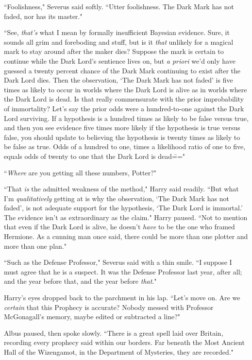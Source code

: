 ``Foolishness," Severus said softly. ``Utter foolishness. The Dark Mark has not faded, nor has its master."

``See, \emph{that's} what I mean by formally insufficient Bayesian evidence. Sure, it sounds all grim and foreboding and stuff, but is it \emph{that} unlikely for a magical mark to stay around after the maker dies? Suppose the mark is certain to continue while the Dark Lord's sentience lives on, but \emph{a priori} we'd only have guessed a twenty percent chance of the Dark Mark continuing to exist after the Dark Lord dies. Then the observation, `The Dark Mark has not faded' is five times as likely to occur in worlds where the Dark Lord is alive as in worlds where the Dark Lord is dead. Is that really commensurate with the prior improbability of immortality? Let's say the prior odds were a hundred-to-one against the Dark Lord surviving. If a hypothesis is a hundred times as likely to be false versus true, and then you see evidence five times more likely if the hypothesis is true versus false, you should update to believing the hypothesis is twenty times as likely to be false as true. Odds of a hundred to one, times a likelihood ratio of one to five, equals odds of twenty to one that the Dark Lord is dead\==="

``\emph{Where} are you getting all these numbers, Potter?"

``That \emph{is} the admitted weakness of the method," Harry said readily. ``But what I'm \emph{qualitatively} getting at is why the observation, `The Dark Mark has not faded', is not adequate support for the hypothesis, `The Dark Lord is immortal.' The evidence isn't as extraordinary as the claim." Harry paused. ``Not to mention that even if the Dark Lord is alive, he doesn't \emph{have} to be the one who framed Hermione. As a cunning man once said, there could be more than one plotter and more than one plan."

``Such as the Defense Professor," Severus said with a thin smile. ``I suppose I must agree that he is a suspect. It was the Defense Professor last year, after all; and the year before that, and the year before \emph{that}."

Harry's eyes dropped back to the parchment in his lap. ``Let's move on. Are we \emph{certain} that this Prophecy is accurate? Nobody messed with Professor McGonagall's memory, maybe edited or subtracted a line?"

Albus paused, then spoke slowly. ``There is a great spell laid over Britain, recording every prophecy said within our borders. Far beneath the Most Ancient Hall of the Wizengamot, in the Department of Mysteries, they are recorded."

